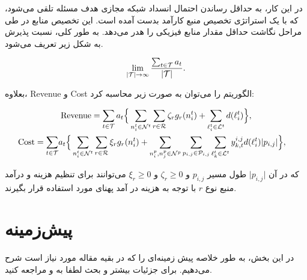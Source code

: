   
  در این کار، به حداقل رساندن احتمال انسداد شبکه مجازی هدف مسئله تلقی می‌شود، که با یک استراتژی تخصیص منبع کارآمد بدست آمده است. این تخصیص منابع در طی مراحل نگاشت حداقل مقدار منابع فیزیکی را هدر می‌دهد. به طور کلی، نسبت پذیرش به شکل زیر تعریف می‌شود.
  

\begin{equation}
\lim_{\vert\mathcal{T}\vert\rightarrow \infty} \frac{\sum_{t\in\mathcal{T}} a_t}{\vert\mathcal{T}\vert}.
\end{equation}

%
بعلاوه، \gls{Revenue} و  \gls{Cost} الگوریتم را می‌توان به صورت زیر محاسبه کرد:

\begin{gather}
\text{Revenue} 
=
\sum_{t\in\mathcal{T}}
a_{t} \Big\{
\sum_{n_{i}^{t} \in \mathcal{N}^{t}}
\sum_{r\in\mathcal{R}}
\zeta_{r}
g_{r}(n_{i}^{t})
+
\sum_{\ell_{i}^{t} \in \mathcal{L}^{t}}
d(\ell_{i}^{t})\Big\}, \label{eq_rev} \\
\begin{split}
\text{Cost} =
\sum_{t\in\mathcal{T}} &
a_{t} \Big\{
\sum_{n_{i}^{t} \in \mathcal{N}^{t}}
\sum_{r\in\mathcal{R}}
\xi_{r}
g_{r}(n_{i}^{t}) + 
\sum_{n_{i}^{p}, n_{j}^{p} \in \mathcal{N}^{p}}
\sum_{p_{i,j} \in \mathcal{P}_{i,j}}
\sum_{\ell_{k}^{t} \in \mathcal{L}^{t}}
y_{k,t}^{i,j}
d(\ell_{i}^{t})\vert p_{i,j}\vert\Big\},
\end{split}
\label{eq_cost} 
\end{gather}

که در آن $\vert p_{i,j}\vert$ طول مسیر $p_{i,j}$ و $\zeta_r \ge 0$ و $\xi_r \ge 0$ می‌توانند برای تنظیم هزینه و درآمد منبع نوع $r$ با توجه به هزینه‌  در آمد پهنای مورد استفاده قرار بگیرند.



\section{پیش‌زمینه}

در این بخش، به طور خلاصه پیش زمینه‌ای را که در بقیه مقاله مورد نیاز است شرح می‌دهیم. برای جزئیات بیشتر و بحث لطفا به
  \cite {graphSage} و \cite {argva}
  مراجعه کنید.

